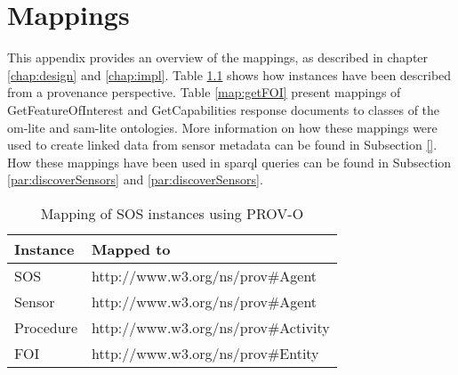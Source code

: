 \chapter{Mappings}
\label{mappings}

This appendix provides an overview of the mappings, as described in chapter \ref{chap:design} and \ref{chap:impl}. Table \ref{map:SOS} shows how instances have been described from a provenance perspective. Table \ref{map:getFOI} present mappings of GetFeatureOfInterest and GetCapabilities response documents to classes of the om-lite and sam-lite ontologies. More information on how these mappings were used to create linked data from sensor metadata can be found in Subsection \ref{}. How these mappings have been used in \ac{sparql} queries can be found in Subsection \ref{par:discoverSensors} and \ref{par:discoverSensors}.

\begin{table}[!htbp]
	\centering
	\caption{Mapping of SOS instances using PROV-O}
	\label{map:SOS}
	\begin{tabular}{l|l}
		Instance		      		  	& Mapped to                           \\ \hline
		SOS  						  	& http://www.w3.org/ns/prov\#Agent     \\
		Sensor                         	& http://www.w3.org/ns/prov\#Agent     \\
		Procedure                       & http://www.w3.org/ns/prov\#Activity  \\
		FOI                           	& http://www.w3.org/ns/prov\#Entity                                                                 
	\end{tabular}
\end{table}

\begin{sidewaystable}[!htbp]
	\centering
	\caption{GetFeatureOfInterest mapping using om-lite and sam-lite}
	\label{map:getFOI}
\end{sidewaystable}

